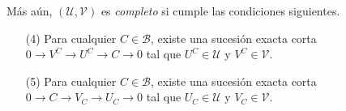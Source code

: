\documentclass[preview]{standalone}
\begin{document}
\begin{center}
Más aún, $(\mathcal{U}, \mathcal{V})$ es \emph{completo} si cumple las condiciones siguientes.\begin{itemize} \item[(4)] Para cualquier $C\in\mathscr{B}$, existe una sucesión exacta corta $0\to V^C\to U^C\to C\to 0$ tal que $U^C\in\mathcal{U}$ y $V^C\in\mathcal{V}$. \item[(5)] Para cualquier $C\in\mathscr{B}$, existe una sucesión exacta corta $0\to C\to V_C\to U_C\to 0$ tal que $U_C\in\mathcal{U}$ y $V_C\in\mathcal{V}$. \end{itemize}
\end{center}
\end{document}

